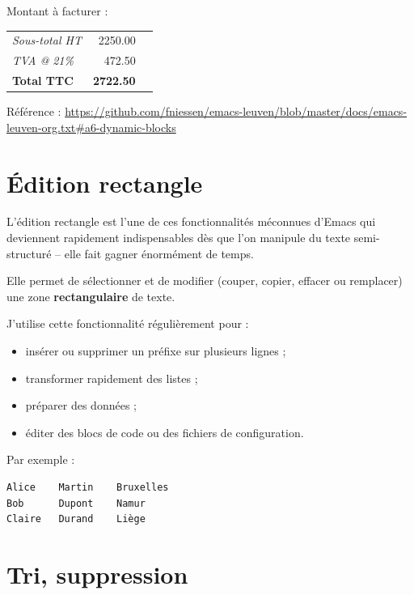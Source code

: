 \documentclass{mcreport}
\begin{document}
Montant à facturer :

\hfill\colorbox{black!10}{\begin{minipage}{7.5cm}
\begin{center}
\begin{tabu}{Xrl}
\emph{Sous-total HT} & 2250.00 & \texteuro{}\\
\emph{TVA @ 21\%} & 472.50 & \texteuro{}\\
\hline
\textbf{Total TTC} & \textbf{2722.50} & \textbf{\texteuro{}}\\
\end{tabu}
\end{center}
\end{minipage}}

Référence :
\url{https://github.com/fniessen/emacs-leuven/blob/master/docs/emacs-leuven-org.txt\#a6-dynamic-blocks}
\section{Édition rectangle}
\label{sec:org087b902}

L'édition rectangle est l'une de ces fonctionnalités méconnues d'Emacs qui
deviennent rapidement indispensables dès que l'on manipule du texte
semi-structuré -- elle fait gagner énormément de temps.

Elle permet de sélectionner et de modifier (couper, copier, effacer ou
remplacer) une zone \textbf{rectangulaire} de texte.

J'utilise cette fonctionnalité régulièrement pour :

\begin{itemize}
\item insérer ou supprimer un préfixe sur plusieurs lignes ;
\item transformer rapidement des listes ;
\item préparer des données ;
\item éditer des blocs de code ou des fichiers de configuration.
\end{itemize}

Par exemple :

\begin{verbatim}
Alice    Martin    Bruxelles
Bob      Dupont    Namur
Claire   Durand    Liège
\end{verbatim}
\section{Tri, suppression}
\label{sec:org279bf9a}
\end{document}

